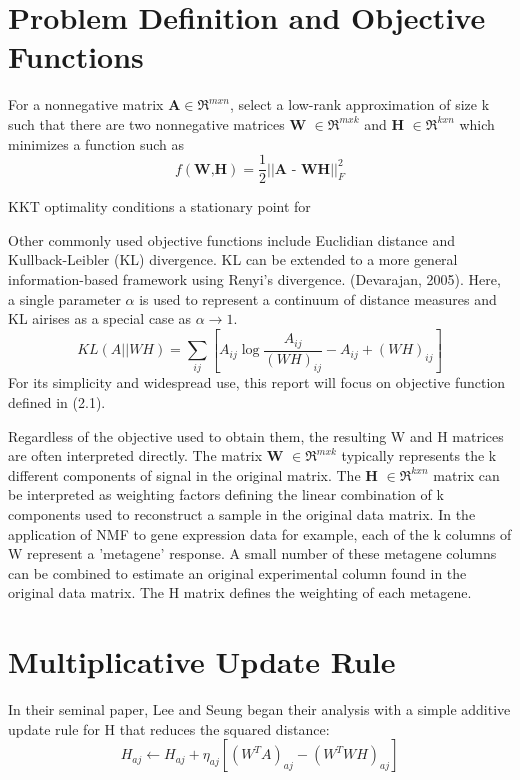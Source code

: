 \documentclass[final,leqno,onefignum,onetabnum]{siamltex1213}
\begin{document}
\section{Problem Definition and Objective Functions}

\begin{definition} For a nonnegative matrix $\textbf{A} \in \Re^{m x n} $, select a low-rank approximation of size k such that there are two nonnegative matrices \textbf{W} $ \in \Re^{m x k}$ and \textbf{H} $ \in \Re^{k x n}$ which minimizes a function such as 
\begin{equation}\label{ObjEuc}
 f( \textbf{W,H}) = \frac{1}{2} || \textbf{A - WH} || ^{2}_{F}
\end{equation}

\end{definition}

KKT optimality conditions a stationary point for 




Other commonly used objective functions include Euclidian distance and Kullback-Leibler (KL) divergence. KL can be extended to a more general information-based framework using Renyi's divergence. (Devarajan, 2005). Here, a single parameter $\alpha$ is used to represent a continuum of distance measures and KL airises as a special case as $\alpha \to 1$. 
\begin{equation}\label{ObjKL}
 KL(A || WH) = \sum_{ij}{[A_{ij} \log{ \frac{A_{ij}}{(WH)_{ij}} - A_{ij} + (WH)_{ij}} ]}
\end{equation}
For its simplicity and widespread use, this report will focus on objective function defined in (2.1). 

Regardless of the objective used to obtain them, the resulting W and H matrices are often interpreted directly. The matrix \textbf{W} $ \in \Re^{m x k}$ typically represents the k different components of signal in the original matrix. The \textbf{H} $ \in \Re^{k x n}$ matrix can be interpreted as weighting factors defining the linear combination of k components used to reconstruct a sample in the original data matrix. In the application of NMF to gene expression data for example, each of the k columns of W represent a 'metagene' response. A small number of these metagene columns can be combined to estimate an original experimental column found in the original data matrix. The H matrix defines the weighting of each metagene. 


\section{Multiplicative Update Rule} In their seminal paper, Lee and Seung began their analysis with a simple additive update rule for H that reduces the squared distance: 
\begin{equation}\label{au1}
 H_{aj} \leftarrow  H_{aj} + \eta_{aj} [ (W^T A)_{aj} - (W^T WH)_{aj}]
\end{equation}
\end{document}
